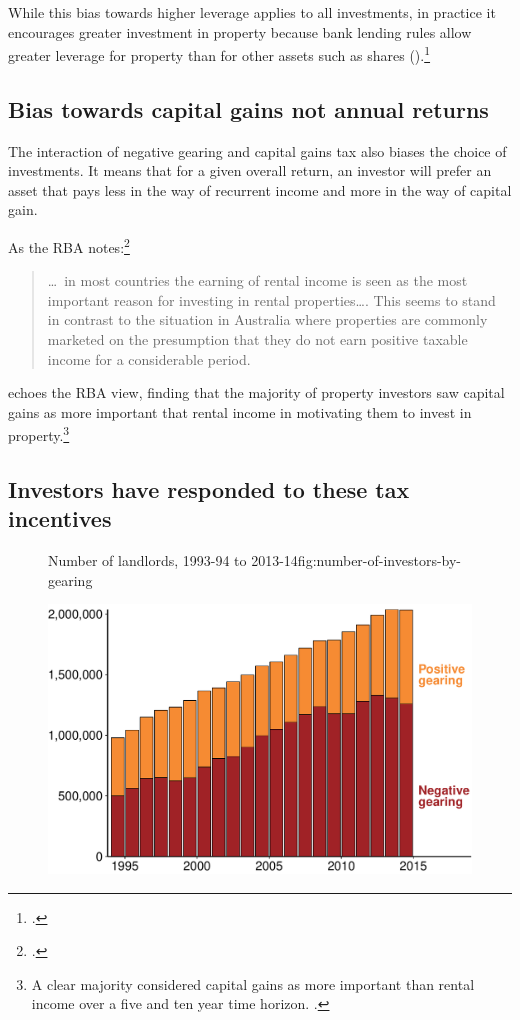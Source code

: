 While this bias towards higher leverage applies to all investments, in practice it encourages greater investment in property because bank lending rules allow greater leverage for property than for other assets such as shares ().\footcite[][23]{RBA2015SubmissionHomeOwnershipInquiry}  


\subsection{Bias towards capital gains not annual returns}
The interaction of negative gearing and capital gains tax also biases the choice of investments. It means that for a given overall return, an investor will prefer an asset that pays less in the way of recurrent income and more in the way of capital gain.

As the RBA notes:\footcite[][42]{RBA2014SubmissionAffordableHousingInquiry}
\begin{quote}
\dots\ in most countries the earning of rental income is seen as the most important reason for investing in rental properties\dots. This seems to stand in contrast to the situation in Australia where properties are commonly marketed on the presumption that they do not earn positive taxable income for a considerable period.
\end{quote}

\textcite{seelig2009understanding} echoes the RBA view, finding that the majority of property investors saw capital gains as more important that rental income in motivating them to invest in property.\footnote{A clear majority considered capital gains as more important than rental income over a five and ten year time horizon. \textcite[][63]{seelig2009understanding}.}

\subsection{Investors have responded to these tax incentives}
\begin{figure}
%
{Number of landlords, 1993-94 to 2013-14}{fig:number-of-investors-by-gearing}

\includegraphics[width=\columnwidth]{CGT-NG-atlas//number-of-investors-by-gearing-1}
\end{figure}

